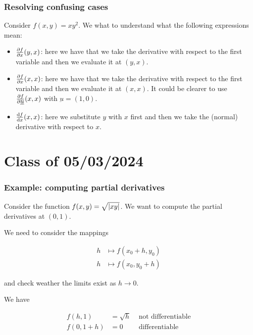 \documentclass[10pt]{extarticle}
\newcommand{\munderbar}[1]{\underbar{\ensuremath{#1}}}
\begin{document}
\subsubsection{Resolving confusing cases}

Consider $f(x, y) = xy^2$. We what to understand what the following expressions mean:

\begin{itemize}
    \item $\pdv{f}{x}()(y,x)$: here we have that we take the derivative with respect to the first variable and then we evaluate it at $(y, x)$.
    \item $\pdv{f}{x}()(x,x)$: here we have that we take the derivative with respect to the first variable and then we evaluate it at $(x, x)$. It could be clearer to use $\pdv{f}{\munderbar{u}}()(x,x)$ with $\munderbar{u} = (1, 0)$.
    \item $\dv{f}{x}()(x,x)$: here we substitute $y$ with $x$ first and then we take the (normal) derivative with respect to $x$.
\end{itemize}

\section{Class of 05/03/2024}

\subsubsection{Example: computing partial derivatives}

Consider the function $f(x, y) = \sqrt{\abs{xy}}$. We want to compute the partial derivatives at $(0, 1)$.

We need to consider the mappings

\begin{align*}
    h & \mapsto f(x_0 +h, y_0) \\
    h & \mapsto f(x_0, y_0 +h)
\end{align*}

and check weather the limits exist as $h \to 0$.

We have

\begin{align*}
    f(h, 1)     & = \sqrt{h} & \text{ not differentiable} \\
    f(0, 1 + h) & = 0        & \text{ differentiable}     \\
\end{align*}
\end{document}
